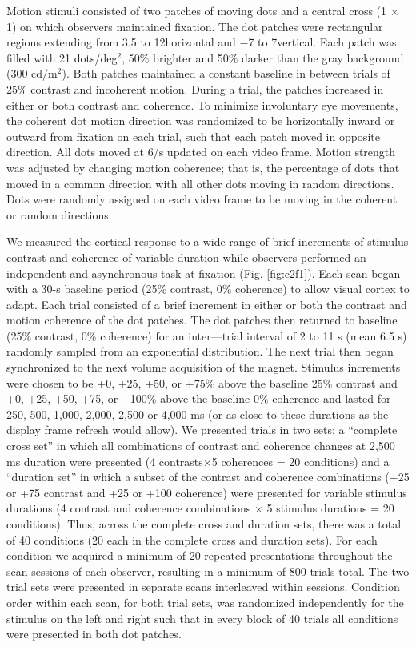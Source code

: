 Motion stimuli consisted of two patches of moving dots and a central cross (1 $\times$ 1\degree) on which observers maintained fixation. The dot patches were rectangular regions extending from 3.5 to 12\degree horizontal and −7 to 7\degree vertical. Each patch was filled with 21 dots/deg$^2$, 50\% brighter and 50\% darker than the gray background (300 cd/m$^2$). Both patches maintained a constant baseline in between trials of 25\% contrast and incoherent motion. During a trial, the patches increased in either or both contrast and coherence. To minimize involuntary eye movements, the coherent dot motion direction was randomized to be horizontally inward or outward from fixation on each trial, such that each patch moved in opposite direction. All dots moved at 6\degree /s updated on each video frame. Motion strength was adjusted by changing motion coherence; that is, the percentage of dots that moved in a common direction with all other dots moving in random directions. Dots were randomly assigned on each video frame to be moving in the coherent or random directions.

We measured the cortical response to a wide range of brief increments of stimulus contrast and coherence of variable duration while observers performed an independent and asynchronous task at fixation (Fig. \ref{fig:c2f1}). Each scan began with a 30-s baseline period (25\% contrast, 0\% coherence) to allow visual cortex to adapt. Each trial consisted of a brief increment in either or both the contrast and motion coherence of the dot patches. The dot patches then returned to baseline (25\% contrast, 0\% coherence) for an inter---trial interval of 2 to 11 s (mean 6.5 s) randomly sampled from an exponential distribution. The next trial then began synchronized to the next volume acquisition of the magnet. Stimulus increments were chosen to be +0, +25, +50, or +75\% above the baseline 25\% contrast and +0, +25, +50, +75, or +100\% above the baseline 0\% coherence and lasted for 250, 500, 1,000, 2,000, 2,500 or 4,000 ms (or as close to these durations as the display frame refresh would allow). We presented trials in two sets; a “complete cross set” in which all combinations of contrast and coherence changes at 2,500 ms duration were presented (4 contrasts×5 coherences = 20 conditions) and a “duration set” in which a subset of the contrast and coherence combinations (+25 or +75 contrast and +25 or +100 coherence) were presented for variable stimulus durations (4 contrast and coherence combinations $\times$ 5 stimulus durations = 20 conditions). Thus, across the complete cross and duration sets, there was a total of 40 conditions (20 each in the complete cross and duration sets). For each condition we acquired a minimum of 20 repeated presentations throughout the scan sessions of each observer, resulting in a minimum of 800 trials total. The two trial sets were presented in separate scans interleaved within sessions. Condition order within each scan, for both trial sets, was randomized independently for the stimulus on the left and right such that in every block of 40 trials all conditions were presented in both dot patches.


